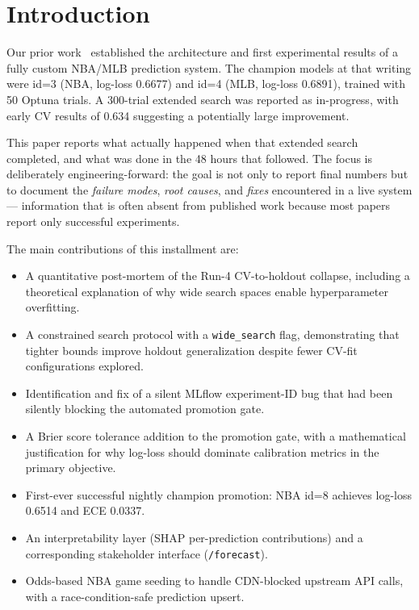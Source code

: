 \documentclass[conference]{IEEEtran}
\begin{document}
\section{Introduction}
\label{sec:intro}

Our prior work~\cite{paper1} established the architecture and first
experimental results of a fully custom NBA/MLB prediction system.  The
champion models at that writing were id=3 (NBA, log-loss 0.6677) and
id=4 (MLB, log-loss 0.6891), trained with 50 Optuna trials.  A
300-trial extended search was reported as in-progress, with early CV
results of 0.634 suggesting a potentially large improvement.

This paper reports what actually happened when that extended search
completed, and what was done in the 48 hours that followed.  The
focus is deliberately engineering-forward: the goal is not only to
report final numbers but to document the \emph{failure modes},
\emph{root causes}, and \emph{fixes} encountered in a live system —
information that is often absent from published work because most
papers report only successful experiments.

The main contributions of this installment are:
\begin{itemize}
  \item A quantitative post-mortem of the Run-4 CV-to-holdout
        collapse, including a theoretical explanation of why wide
        search spaces enable hyperparameter overfitting.
  \item A constrained search protocol with a \texttt{wide\_search}
        flag, demonstrating that tighter bounds improve holdout
        generalization despite fewer CV-fit configurations explored.
  \item Identification and fix of a silent MLflow experiment-ID bug
        that had been silently blocking the automated promotion gate.
  \item A Brier score tolerance addition to the promotion gate, with
        a mathematical justification for why log-loss should dominate
        calibration metrics in the primary objective.
  \item First-ever successful nightly champion promotion: NBA id=8
        achieves log-loss 0.6514 and ECE 0.0337.
  \item An interpretability layer (SHAP per-prediction contributions)
        and a corresponding stakeholder interface (\texttt{/forecast}).
  \item Odds-based NBA game seeding to handle CDN-blocked upstream
        API calls, with a race-condition-safe prediction upsert.
\end{itemize}
\end{document}
